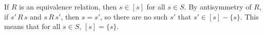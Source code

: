 \exercise
If $R$ is an equivalence relation, then $s\in[s]$ for all $s\in S$.
By antisymmetry of $R$, if $s'\,R\,s$ and $s\,R\,s'$, then $s=s'$, so there are no such $s'$ that $s'\in[s]-\{s\}$.
This means that for all $s\in S$, $[s]=\{s\}$.
